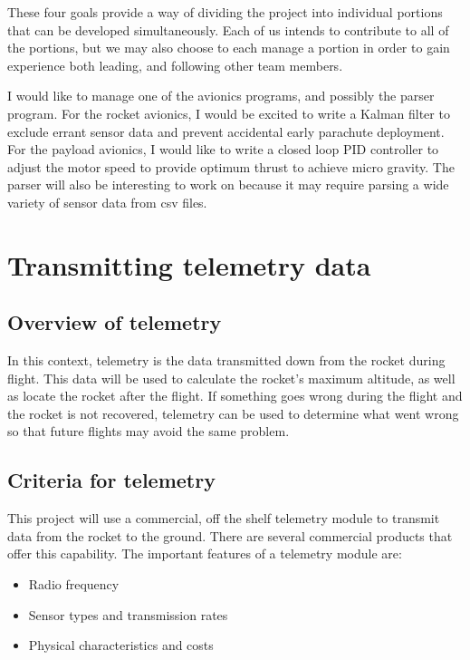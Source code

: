 \documentclass[onecolumn, draftclsnofoot, 10pt, compsoc]{IEEEtran}
\begin{document}
These four goals provide a way of dividing the project into individual portions that can be developed simultaneously.  Each of us intends to contribute to all of the portions, but we may also choose to each manage a portion in order to gain experience both leading, and following other team members.

I would like to manage one of the avionics programs, and possibly the parser program.  For the rocket avionics, I would be excited to write a Kalman filter to exclude errant sensor data and prevent accidental early parachute deployment.  For the payload avionics, I would like to write a closed loop PID controller to adjust the motor speed to provide optimum thrust to achieve micro gravity.  The parser will also be interesting to work on because it may require parsing a wide variety of sensor data from csv files.


\section{Transmitting telemetry data}

\subsection{Overview of telemetry}
In this context, telemetry is the data transmitted down from the rocket during flight.  This data will be used to calculate the rocket's maximum altitude, as well as locate the rocket after the flight.  If something goes wrong during the flight and the rocket is not recovered, telemetry can be used to determine what went wrong so that future flights may avoid the same problem.

\subsection{Criteria for telemetry}
This project will use a commercial, off the shelf telemetry module to transmit data from the rocket to the ground.  There are several commercial products that offer this capability.  The important features of a telemetry module are:

\begin{itemize}
	\item Radio frequency
    \item Sensor types and transmission rates
    \item Physical characteristics and costs
\end{itemize}
\end{document}
